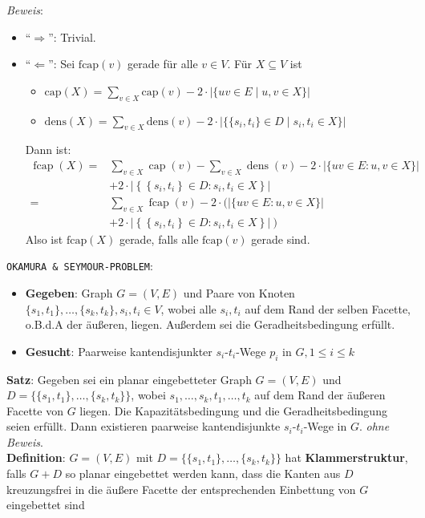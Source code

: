 \textit{Beweis}:
\begin{itemize}
	\item \enquote{$\Rightarrow$}: Trivial.
	\item \enquote{$\Leftarrow$}: Sei $\text{fcap}(v)$ gerade für alle $v\in V$. Für $X\subseteq V$ ist
	\begin{itemize}
		\item $\text{cap}(X)=\sum\limits_{v\in X} \text{cap}(v)-2\cdot |\{uv\in E\mid u,v\in X\}|$
		\item $\text{dens}(X)=\sum\limits_{v\in X}\text{dens}(v)-2\cdot |\{\{s_i,t_i\}\in D\mid s_i,t_i\in X\}|$
	\end{itemize}
	Dann ist:
	$$
	\begin{aligned}
		\operatorname{fcap}(X)= & \sum_{v \in X} \operatorname{cap}(v)-\sum_{v \in X} \operatorname{dens}(v)-2 \cdot|\{uv \in E: u, v \in X\}| \\
		& +2\cdot\left|\left\{\left\{s_{i}, t_{i}\right\} \in D: s_{i}, t_{i} \in X\right\}\right| \\
		= & \sum_{v \in X} \operatorname{fcap}(v)-2 \cdot(|\{uv \in E: u, v \in X\}| \\
		& \left.+2\cdot\left|\left\{\left\{s_{i}, t_{i}\right\} \in D: s_{i}, t_{i} \in X\right\}\right|\right)
	\end{aligned}
	$$
	Also ist $\text{fcap}(X)$ gerade, falls alle $\text{fcap}(v)$ gerade sind.
\end{itemize}
\bigskip
\texttt{OKAMURA \& SEYMOUR-PROBLEM}:
\begin{itemize}
	\item \textbf{Gegeben}: Graph $G=(V,E)$ und Paare von Knoten $\{s_1,t_1\},\ldots,\{s_k,t_k\}, s_i,t_i\in V$, wobei alle $s_i,t_i$ auf dem Rand der selben Facette, o.B.d.A der äußeren, liegen.  Außerdem sei die Geradheitsbedingung erfüllt.
	\item \textbf{Gesucht}: Paarweise kantendisjunkter $s_i$-$t_i$-Wege $p_i$ in $G, 1 \leq i \leq k$
\end{itemize}
\pagebreak
\textbf{Satz}: Gegeben sei ein planar eingebetteter Graph $G = (V, E)$ und $D=\{\{s_1,t_1\},\ldots,\{s_k,t_k\}\}$, wobei $s_1,\ldots,s_k,t_1,\ldots,t_k$ auf dem Rand der äußeren Facette von $G$ liegen. Die Kapazitätsbedingung und die Geradheitsbedingung seien erfüllt. Dann existieren paarweise kantendisjunkte $s_i$-$t_i$-Wege in $G$. \qquad \textit{ohne Beweis}.\\

\textbf{Definition}: $G = (V, E)$ mit $D=\{\{s_1,t_1\},\ldots,\{s_k,t_k\}\}$ hat \textbf{Klammerstruktur}, falls $G + D$ so planar eingebettet werden kann, dass die Kanten aus $D$ kreuzungsfrei in die äußere Facette der entsprechenden Einbettung von $G$ eingebettet sind\\

